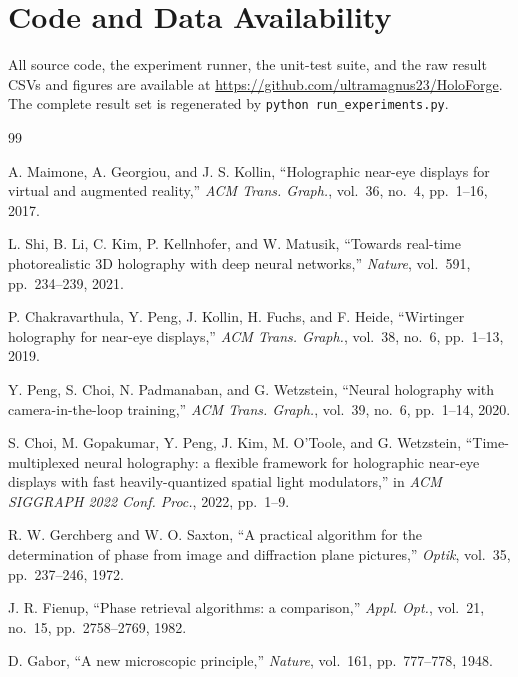 \documentclass[conference]{IEEEtran}
\begin{document}
\section*{Code and Data Availability}
All source code, the experiment runner, the unit-test suite, and the raw result
CSVs and figures are available at
\url{https://github.com/ultramagnus23/HoloForge}. The complete result set is
regenerated by \texttt{python run\_experiments.py}.


\begin{thebibliography}{99}

A. Maimone, A. Georgiou, and J. S. Kollin, ``Holographic near-eye displays for
virtual and augmented reality,'' \textit{ACM Trans. Graph.}, vol.~36, no.~4,
pp.~1--16, 2017.

L. Shi, B. Li, C. Kim, P. Kellnhofer, and W. Matusik, ``Towards real-time
photorealistic 3D holography with deep neural networks,'' \textit{Nature},
vol.~591, pp.~234--239, 2021.

P. Chakravarthula, Y. Peng, J. Kollin, H. Fuchs, and F. Heide, ``Wirtinger
holography for near-eye displays,'' \textit{ACM Trans. Graph.}, vol.~38, no.~6,
pp.~1--13, 2019.

Y. Peng, S. Choi, N. Padmanaban, and G. Wetzstein, ``Neural holography with
camera-in-the-loop training,'' \textit{ACM Trans. Graph.}, vol.~39, no.~6,
pp.~1--14, 2020.

S. Choi, M. Gopakumar, Y. Peng, J. Kim, M. O'Toole, and G. Wetzstein,
``Time-multiplexed neural holography: a flexible framework for holographic
near-eye displays with fast heavily-quantized spatial light modulators,'' in
\textit{ACM SIGGRAPH 2022 Conf. Proc.}, 2022, pp.~1--9.

R. W. Gerchberg and W. O. Saxton, ``A practical algorithm for the determination
of phase from image and diffraction plane pictures,'' \textit{Optik}, vol.~35,
pp.~237--246, 1972.

J. R. Fienup, ``Phase retrieval algorithms: a comparison,'' \textit{Appl. Opt.},
vol.~21, no.~15, pp.~2758--2769, 1982.

D. Gabor, ``A new microscopic principle,'' \textit{Nature}, vol.~161,
pp.~777--778, 1948.


\end{thebibliography}
\end{document}
